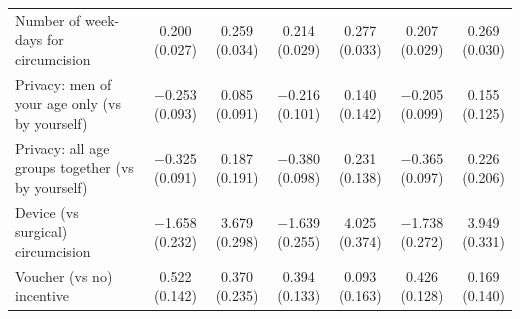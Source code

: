 \begin{tabular}{lcccccc}
Number of week-days for circumcision & \makecell{0.200 \\ {\footnotesize (0.027)}} & \makecell{0.259 \\ {\footnotesize (0.034)}} & \makecell{0.214 \\ {\footnotesize (0.029)}} & \makecell{0.277 \\ {\footnotesize (0.033)}} & \makecell{0.207 \\ {\footnotesize (0.029)}} & \makecell{0.269 \\ {\footnotesize (0.030)}} \\
Privacy: men of your age only (vs by yourself) & \makecell{$-$0.253 \\ {\footnotesize (0.093)}} & \makecell{0.085 \\ {\footnotesize (0.091)}} & \makecell{$-$0.216 \\ {\footnotesize (0.101)}} & \makecell{0.140 \\ {\footnotesize (0.142)}} & \makecell{$-$0.205 \\ {\footnotesize (0.099)}} & \makecell{0.155 \\ {\footnotesize (0.125)}} \\
Privacy: all age groups together (vs by yourself) & \makecell{$-$0.325 \\ {\footnotesize (0.091)}} & \makecell{0.187 \\ {\footnotesize (0.191)}} & \makecell{$-$0.380 \\ {\footnotesize (0.098)}} & \makecell{0.231 \\ {\footnotesize (0.138)}} & \makecell{$-$0.365 \\ {\footnotesize (0.097)}} & \makecell{0.226 \\ {\footnotesize (0.206)}} \\
Device (vs surgical) circumcision & \makecell{$-$1.658 \\ {\footnotesize (0.232)}} & \makecell{3.679 \\ {\footnotesize (0.298)}} & \makecell{$-$1.639 \\ {\footnotesize (0.255)}} & \makecell{4.025 \\ {\footnotesize (0.374)}} & \makecell{$-$1.738 \\ {\footnotesize (0.272)}} & \makecell{3.949 \\ {\footnotesize (0.331)}} \\
Voucher (vs no) incentive & \makecell{0.522 \\ {\footnotesize (0.142)}} & \makecell{0.370 \\ {\footnotesize (0.235)}} & \makecell{0.394 \\ {\footnotesize (0.133)}} & \makecell{0.093 \\ {\footnotesize (0.163)}} & \makecell{0.426 \\ {\footnotesize (0.128)}} & \makecell{0.169 \\ {\footnotesize (0.140)}} \\

\end{tabular}
